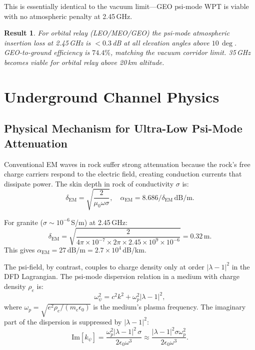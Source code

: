 \documentclass[aps,prd,twocolumn,superscriptaddress]{revtex4-2}
\newcommand{\lambdaone}{|\lambda{-}1|}
\newtheorem{result}{Result}
\begin{document}
This is essentially identical to the vacuum limit---GEO psi-mode WPT
is viable with no atmospheric penalty at 2.45\,GHz.

\begin{result}
For orbital relay (LEO/MEO/GEO) the psi-mode atmospheric insertion
loss at 2.45\,GHz is $< 0.3$\,dB at all elevation angles above
$10\,\deg$.  GEO-to-ground efficiency is $74.4\%$, matching the
vacuum corridor limit.  35\,GHz becomes viable for orbital relay
above 20\,km altitude.
\end{result}

\section{Underground Channel Physics}
\label{sec:underground}

\subsection{Physical Mechanism for Ultra-Low Psi-Mode Attenuation}

Conventional EM waves in rock suffer strong attenuation because the
rock's free charge carriers respond to the electric field, creating
conduction currents that dissipate power.  The skin depth in rock of
conductivity $\sigma$ is:
\begin{equation}
\delta_\mathrm{EM} = \sqrt{\frac{2}{\mu_0\omega\sigma}},
\quad
\alpha_\mathrm{EM} = 8.686/\delta_\mathrm{EM}\,\mathrm{dB/m}.
\label{eq:EM_skin}
\end{equation}

For granite ($\sigma \sim 10^{-6}$\,S/m) at 2.45\,GHz:
\begin{equation}
\delta_\mathrm{EM} = \sqrt{\frac{2}{4\pi\times10^{-7}\times2\pi\times2.45\times10^9
\times10^{-6}}} = 0.32\,\mathrm{m}.
\label{eq:EM_skin_granite}
\end{equation}
This gives $\alpha_\mathrm{EM} = 27\,\mathrm{dB/m} = 2.7\times10^4$\,dB/km.

The psi-field, by contrast, couples to charge density only at
order $\lambdaone^2$ in the DFD Lagrangian.  The psi-mode
dispersion relation in a medium with charge density $\rho_e$ is:
\begin{equation}
\omega_\psi^2 = c^2 k^2 + \omega_p^2 \lambdaone^2,
\label{eq:psi_dispersion_rock}
\end{equation}
where $\omega_p = \sqrt{e^2\rho_e/(m_e\epsilon_0)}$ is the medium's
plasma frequency.  The imaginary part of the dispersion is
suppressed by $\lambdaone^2$:
\begin{equation}
\mathrm{Im}[k_\psi] = \frac{\omega_p^2\lambdaone^2\,\sigma}{2\epsilon_0\omega^3}
\approx \frac{\lambdaone^2\sigma\omega_p^2}{2\epsilon_0\omega^3}.
\label{eq:Im_kpsi}
\end{equation}
\end{document}

